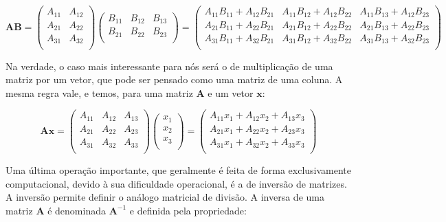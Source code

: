 \documentclass[portuges,]{tufte-handout}
\begin{document}
\[
\mathbf{A}\mathbf{B} =
\left (
\begin{matrix}
A_{11} & A_{12} \\
A_{21} & A_{22}  \\
A_{31} & A_{32} \\
\end{matrix}
\right )
\left (
\begin{matrix}
B_{11} & B_{12} & B_{13} \\
B_{21} & B_{22} & B_{23} \\
\end{matrix}
\right )
=
\left (
\begin{smallmatrix}
A_{11}B_{11} +  A_{12}B_{21} & A_{11}B_{12} +  A_{12}B_{22} & A_{11}B_{13} +  A_{12}B_{23} \\
A_{21}B_{11} +  A_{22}B_{21} & A_{21}B_{12} +  A_{22}B_{22} & A_{21}B_{13} +  A_{22}B_{23} \\
A_{31}B_{11} +  A_{32}B_{21} & A_{31}B_{12} +  A_{32}B_{22} & A_{31}B_{13} +  A_{32}B_{23} \\
\end{smallmatrix}
\right )
\]

Na verdade, o caso mais interessante para nós será o de multiplicação de
uma matriz por um vetor, que pode ser pensado como uma matriz de uma
coluna. A mesma regra vale, e temos, para uma matriz \(\mathbf{A}\) e um
vetor \(\mathbf{x}\):

\[
\mathbf{A}\mathbf{x}  =
\left (
\begin{matrix}
A_{11} & A_{12} & A_{13}\\
A_{21} & A_{22} & A_{23} \\
A_{31} & A_{32} & A_{33}\\
\end{matrix}
\right )
\left (
\begin{matrix}
x_{1}  \\
x_{2}   \\
x_{3}  \\
\end{matrix}
\right )
=
\left (
\begin{matrix}
A_{11}x_{1} +  A_{12}x_{2} +  A_{13}x_{3}\\
A_{21}x_{1} +  A_{22}x_{2} +  A_{23}x_{3}\\
A_{31}x_{1} +  A_{32}x_{2} +  A_{33}x_{3}\\
\end{matrix}
\right )
\]

Uma última operação importante, que geralmente é feita de forma
exclusivamente computacional, devido à sua dificuldade operacional, é a
de inversão de matrizes. A inversão permite definir o análogo matricial
de divisão. A inversa de uma matriz \(\mathbf{A}\) é denominada
\(\mathbf{A}^{-1}\) e definida pela propriedade:
\end{document}
